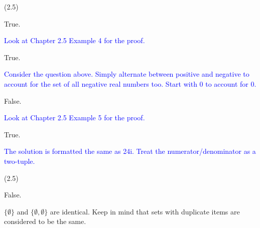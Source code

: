 \documentclass{exam}
\begin{document}
\begin{questions}
\begin{subparts}
\end{subparts}

 (2.5)
\begin{subparts}

\begin{center}

True.

\textcolor{blue}{Look at Chapter 2.5 Example 4 for the proof.}

\end{center}


\begin{center}

True.

\textcolor{blue}{Consider the question above. Simply alternate between positive and negative to account for the set of all negative real numbers too. Start with 0 to account for 0.}

\end{center}


\begin{center}

False.

\textcolor{blue}{Look at Chapter 2.5 Example 5 for the proof.}

\end{center}


\begin{center}

True.

\textcolor{blue}{The solution is formatted the same as 24i. Treat the numerator/denominator as a two-tuple.}

\end{center}

\end{subparts}

 (2.5)

\begin{center}

False.

\( \{\emptyset\} \) and \( \{\emptyset, \emptyset\} \) are identical. Keep in mind that sets with duplicate items are considered to be the same.


\end{center}
\end{questions}
\end{document}
